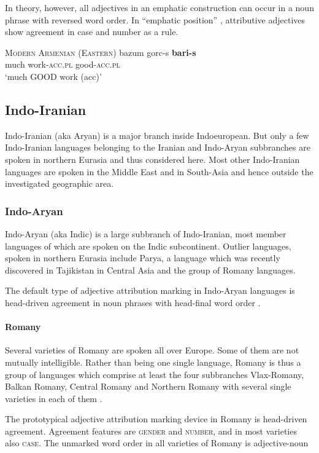 In theory, however, all adjectives in an emphatic construction can occur in a noun phrase with reversed word order. In “emphatic position” \cite[224]{ajello1998}, attributive adjectives show agreement in case and number as a rule.
\begin{exe}
\ex \textsc{Modern Armenian (Eastern)} \cite[224]{ajello1998}
\gll	bazum gorc-s \textbf{bari-s}\\
	much work-\textsc{acc.pl} good-\textsc{acc.pl}\\
\glt	‘much GOOD work (acc)’
\end{exe}

\subsection{Indo-Iranian}
Indo-Iranian (aka Aryan) is a major branch inside Indoeuropean. But only a few Indo-Iranian languages belonging to the Iranian and Indo-Aryan subbranches are spoken in northern Eurasia and thus considered here. Most other Indo-Iranian languages are spoken in the Middle East and in South-Asia and hence outside the investigated geographic area. 

\subsubsection{Indo-Aryan}
Indo-Aryan (aka Indic) is a large subbranch of Indo-Iranian, most member languages of which are spoken on the Indic subcontinent. Outlier languages, spoken in northern Eurasia include Parya, a language which was recently discovered in Tajikistan in Central Asia \cite[22]{masica1991} and the group of Romany languages. 

The default type of adjective attribution marking in Indo-Aryan languages is head-driven agreement in noun phrases with head-final word order \cite[369]{masica1991}.

\paragraph{Romany}

Several varieties of Romany are spoken all over Europe. Some of them are not mutually intelligible. Rather than being one single language, Romany is thus a group of languages which comprise at least the four subbranches Vlax-Romany, Balkan Romany, Central Romany and Northern Romany with several single varieties in each of them \citep[2–3]{halwachs-etal2002}.

The prototypical adjective attribution marking device in Romany is head-driven agreement. Agreement features are \textsc{gender} and \textsc{number}, and in most varieties also \textsc{case}. The unmarked word order in all varieties of Romany is adjective-noun %

